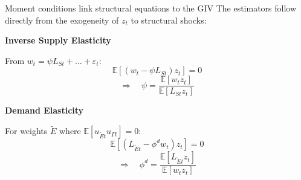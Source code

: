 \documentclass[aspectratio=169,11pt]{beamer}
\begin{document}
\begin{frame}{Moment conditions link structural equations to the GIV}
    \vspace{0.5cm}
    \centering
    The estimators follow directly from the exogeneity of $z_t$ to structural shocks:

    \vspace{0.6cm}
    \begin{minipage}{0.48\textwidth}
        \centering
        \textbf{Inverse Supply Elasticity}

        \vspace{0.2cm}
        From $w_t = \psi L_{St} + \dots + \varepsilon_t$:
        \begin{equation*}
            \mathbb{E}[(w_t - \psi L_{St}) z_t] = 0
        \end{equation*}
        \vspace{0.1cm}
        \begin{equation*}
            \Rightarrow \quad \psi = \frac{\mathbb{E}[w_t z_t]}{\mathbb{E}[L_{St} z_t]}
        \end{equation*}
    \end{minipage}
    \hfill
    \begin{minipage}{0.48\textwidth}
        \centering
        \textbf{Demand Elasticity}

        \vspace{0.2cm}
        For weights $\tilde{E}$ where $\mathbb{E}[u_{\tilde{E}t} u_{\Gamma t}] = 0$:
        \begin{equation*}
            \mathbb{E}[(L_{\tilde{E}t} - \phi^d w_t) z_t] = 0
        \end{equation*}
        \vspace{0.1cm}
        \begin{equation*}
            \Rightarrow \quad \phi^d = \frac{\mathbb{E}[L_{\tilde{E}t} z_t]}{\mathbb{E}[w_t z_t]}
        \end{equation*}
    \end{minipage}
    \vspace{0.1cm}
    \hfill \hyperlink{src_propositions}{}
\end{frame}
\end{document}
